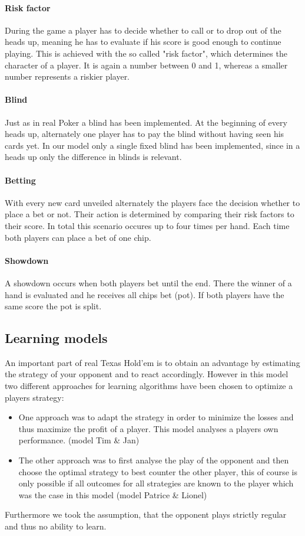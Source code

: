 \documentclass[11pt]{article}
\begin{document}
\paragraph{Risk factor}
During the game a player has to decide whether to call or to drop out of the heads up, meaning he has to evaluate if his score is good enough to continue playing. This is achieved with the so called "risk factor", which determines the character of a player. It is again a number between 0 and 1, whereas a smaller number represents a riskier player.

\paragraph{Blind}
Just as in real Poker a blind has been implemented. At the beginning of every heads up, alternately one player has to pay the blind without having seen his cards yet. In our model only a single fixed blind has been implemented, since in a heads up only the difference in  blinds is relevant.

\paragraph{Betting}
With every new card unveiled alternately the players face the decision whether to place a bet or not. Their action is determined by comparing their risk factors to their score. In total this scenario occures up to four times per hand. Each time both players can place a bet of one chip.

\paragraph{Showdown}
A showdown occurs when both players bet until the end. There the winner of a hand is evaluated and he receives all chips bet (pot). If both players have the same score the pot is split.
\subsection{Learning models}
An important part of real Texas Hold’em is to obtain an advantage by estimating the strategy of your opponent and to react accordingly.
However in this model two different approaches for learning algorithms have been chosen to optimize a players strategy:
\begin{itemize}
\item One approach was to adapt the strategy in order to minimize the losses and thus maximize the profit of a player. This model analyses a players own performance. (model Tim \& Jan)%
\item  The other approach was to first analyse the play of the opponent and then choose the optimal strategy to best counter the other player, this of course is only possible if all outcomes for all strategies are known to the player which was the case in this model (model Patrice \& Lionel)\\
\end{itemize}
Furthermore we took the assumption, that the opponent plays strictly regular and thus no ability to learn.
\end{document}
